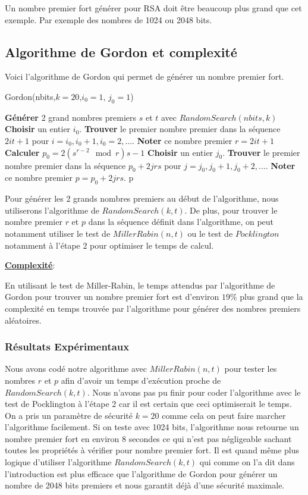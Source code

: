 Un nombre premier fort générer pour RSA doit être beaucoup plus grand que cet exemple. Par exemple des nombres de 1024 ou 2048 bits.

\subsection{Algorithme de Gordon et complexité}

Voici l'algorithme de Gordon qui permet de générer un nombre premier fort.

\begin{algorithm}
\caption{Gordon(nbits,$k=20$,$i_0=1$, $j_0=1$)}
\begin{algorithmic}[1]
\State \textbf{Générer} 2 grand nombres premiers $s$ et $t$ avec $RandomSearch(nbits,k)$
\State  \textbf{Choisir} un entier $i_0$. \textbf{Trouver} le premier nombre premier dans la séquence $2it+1$ pour $i=i_0,i_0+1,i_0=2,...$. \textbf{Noter} ce nombre premier $r=2it+1$
\State \textbf{Calculer} $p_0=2(s^{r-2} \mod r)s -1$
\State  \textbf{Choisir} un entier $j_0$. \textbf{Trouver} le premier nombre premier dans la séquence $p_0+2jrs$ pour $j=j_0,j_0+1,j_0+2,...$. \textbf{Noter} ce nombre premier $p=p_0+2jrs$.
\State \Return p
\end{algorithmic}
\end{algorithm}

Pour générer les 2 grands nombres premiers au début de l'algorithme, nous utiliserons l'algorithme de $RandomSearch(k,t)$. De plus, pour trouver le nombre premier $r$ et $p$ dans la séquence définit dans l'algorithme, on peut notamment utiliser le test de $MillerRabin(n,t)$ ou le test de $Pocklington$ notamment à l'étape 2 pour optimiser le temps de calcul.

\underline{\textbf{Complexité}}:

En utilisant le test de Miller-Rabin, le temps attendus par l'algorithme de Gordon pour trouver un nombre premier fort est d'environ $19\%$ plus grand que la complexité en temps trouvée par l'algorithme pour générer des nombres premiers aléatoires.

\subsubsection{Résultats Expérimentaux}

Nous avons codé notre algorithme avec $MillerRabin(n,t)$ pour tester les nombres $r$ et $p$ afin d'avoir un temps d'exécution proche de $RandomSearch(k,t)$. Nous n'avons pas pu finir pour coder l'algorithme avec le test de Pocklington à l'étape 2 car il est certain que ceci optimiserait le temps. 
On a pris un paramètre de sécurité $k=20$ comme cela on peut faire marcher l'algorithme facilement. Si on teste avec 1024 bits, l'algorithme nous retourne un nombre premier fort en environ 8 secondes ce qui n'est pas négligeable sachant toutes les propriétés à vérifier pour nombre premier fort.
Il est quand même plus logique d'utiliser l'algorithme $RandomSearch(k,t)$ qui comme on l'a dit dans l'introduction est plus efficace que l'algorithme de Gordon pour générer un nombre de 2048 bits premiers et nous garantit déjà d'une sécurité maximale.


